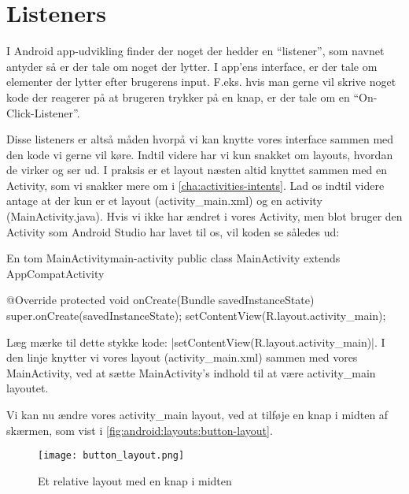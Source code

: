 \cleardoublepage

\FloatBarrier
\section{Listeners}
I Android app-udvikling finder der noget der hedder en ``listener'', som navnet 
antyder så er der tale om noget der lytter. I app'ens \gls{interface}, er der 
tale om elementer der lytter efter brugerens input. F.eks. hvis man gerne vil 
skrive noget kode der reagerer på at brugeren trykker på en knap, er der tale 
om en ``On-Click-Listener''.

Disse listeners er altså måden hvorpå vi kan knytte vores \gls{interface} 
sammen med den kode vi gerne vil køre. Indtil videre har vi kun snakket om 
layouts, hvordan de virker og ser ud. I praksis er et layout næsten altid 
knyttet sammen med en Activity, som vi snakker mere om i 
\autoref{cha:activities-intents}. Lad os indtil videre antage at der kun er et 
layout (activity\_main.xml) og en activity (MainActivity.java). Hvis vi ikke 
har ændret i vores Activity, men blot bruger den Activity som Android Studio 
har lavet til os, vil koden se således ud:

\begin{JavaCode}{En tom MainActivity}{main-activity}
	public class MainActivity extends AppCompatActivity {
		
		@Override
		protected void onCreate(Bundle savedInstanceState) {
			super.onCreate(savedInstanceState);
			setContentView(R.layout.activity_main);
		}
	
	}
\end{JavaCode}

Læg mærke til dette stykke kode: 
\JavaInline|setContentView(R.layout.activity_main)|. I den linje knytter vi 
vores layout (activity\_main.xml) sammen med vores MainActivity, ved at sætte 
MainActivity's indhold til at være activity\_main layoutet.

Vi kan nu ændre vores activity\_main layout, ved at tilføje en knap i midten af 
skærmen, som vist i \autoref{fig:android:layouts:button-layout}.

\begin{figure}[h]
	\begin{center}
		\texttt{[image: button\_layout.png]}
		\caption{Et relative layout med en knap i midten}
		\label{fig:android:layouts:button-layout}
	\end{center}
\end{figure}


